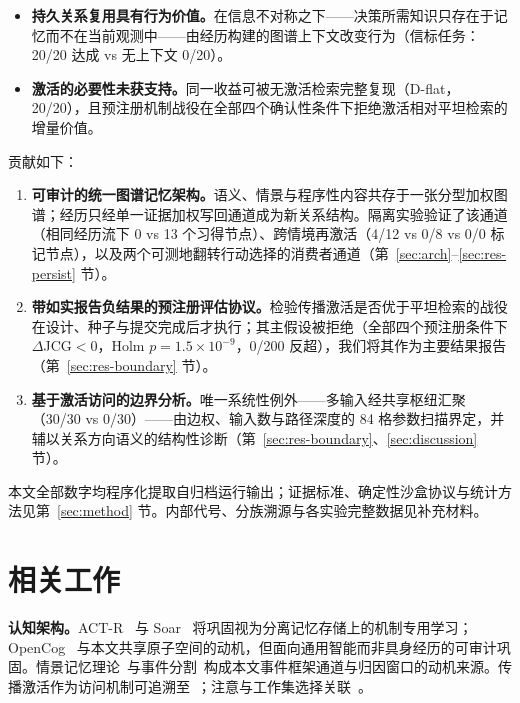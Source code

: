 \documentclass[10pt,a4paper]{ctexart}
\begin{document}
\begin{itemize}
\item[(a)] \textbf{持久关系复用具有行为价值。}在信息不对称之下——决策所需知识只存在于记忆而不在当前观测中——由经历构建的图谱上下文改变行为（信标任务：20/20 达成 vs 无上下文 0/20）。
\item[(b)] \textbf{激活的必要性未获支持。}同一收益可被无激活检索完整复现（D-flat，20/20），且预注册机制战役在全部四个确认性条件下拒绝激活相对平坦检索的增量价值。
\end{itemize}

贡献如下：
\begin{enumerate}
\item \textbf{可审计的统一图谱记忆架构。}语义、情景与程序性内容共存于一张分型加权图谱；经历只经单一证据加权写回通道成为新关系结构。隔离实验验证了该通道（相同经历流下 0 vs 13 个习得节点）、跨情境再激活（4/12 vs 0/8 vs 0/0 标记节点），以及两个可测地翻转行动选择的消费者通道（第~\ref{sec:arch}--\ref{sec:res-persist} 节）。
\item \textbf{带如实报告负结果的预注册评估协议。}检验传播激活是否优于平坦检索的战役在设计、种子与提交完成后才执行；其主假设被拒绝（全部四个预注册条件下 $\Delta$JCG${<}0$，Holm $p{=}1.5\times10^{-9}$，0/200 反超），我们将其作为主要结果报告（第~\ref{sec:res-boundary} 节）。
\item \textbf{基于激活访问的边界分析。}唯一系统性例外——多输入经共享枢纽汇聚（30/30 vs 0/30）——由边权、输入数与路径深度的 84 格参数扫描界定，并辅以关系方向语义的结构性诊断（第~\ref{sec:res-boundary}、\ref{sec:discussion} 节）。
\end{enumerate}

本文全部数字均程序化提取自归档运行输出；证据标准、确定性沙盒协议与统计方法见第~\ref{sec:method} 节。内部代号、分族溯源与各实验完整数据见补充材料。

\section{相关工作}
\label{sec:related}

\textbf{认知架构。}ACT-R~\citep{anderson2004integrated} 与 Soar~\citep{laird2012soar} 将巩固视为分离记忆存储上的机制专用学习；OpenCog~\citep{hart2008opencog} 与本文共享原子空间的动机，但面向通用智能而非具身经历的可审计巩固。情景记忆理论~\citep{tulving1983elements,baddeley2000episodic}与事件分割~\citep{zacks2007event,schacter2007remembering}构成本文事件框架通道与归因窗口的动机来源。传播激活作为访问机制可追溯至~\citet{collins1975spreading}；注意与工作集选择关联~\citet{itti2001computational,posner1980orienting,cowan2001magical}。
\end{document}
